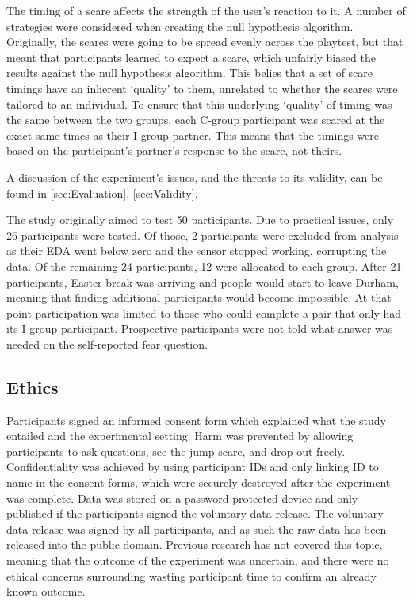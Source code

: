 \documentclass[12pt,a4paper]{article}\usepackage[]{graphicx}\usepackage[]{color}
\begin{document}
The timing of a scare affects the strength of the user's reaction to it.
A number of strategies were considered when creating the null hypothesis algorithm.
Originally, the scares were going to be spread evenly across the playtest, but that meant that participants learned to expect a scare, which unfairly biased the results against the null hypothesis algorithm.
This belies that a set of scare timings have an inherent `quality' to them, unrelated to whether the scares were tailored to an individual.
To ensure that this underlying `quality' of timing was the same between the two groups, each C-group participant was scared at the exact same times as their I-group partner.
This means that the timings were based on the participant's partner's response to the scare, not theirs.

A discussion of the experiment's issues, and the threats to its validity, can be found in \hyperref[sec:Validity]{\cref{sec:Evaluation}, \vref{sec:Validity}}.

The study originally aimed to test 50 participants.
Due to practical issues, only 26 participants were tested.
Of those, 2 participants were excluded from analysis as their EDA went below zero and the sensor stopped working, corrupting the data.
Of the remaining 24 participants, 12 were allocated to each group.
After 21 participants, Easter break was arriving and people would start to leave Durham, meaning that finding additional participants would become impossible.
At that point participation was limited to those who could complete a pair that only had its I-group participant.
Prospective participants were not told what answer was needed on the self-reported fear question.

\subsection{Ethics}
Participants signed an informed consent form which explained what the study entailed and the experimental setting.
Harm was prevented by allowing participants to ask questions, see the jump scare, and drop out freely.
Confidentiality was achieved by using participant IDs and only linking ID to name in the consent forms, which were securely destroyed after the experiment was complete.
Data was stored on a password-protected device and only published if the participants signed the voluntary data release.
The voluntary data release was signed by all participants, and as such the raw data has been released into the public domain.
Previous research has not covered this topic, meaning that the outcome of the experiment was uncertain, and there were no ethical concerns surrounding wasting participant time to confirm an already known outcome.
\end{document}
